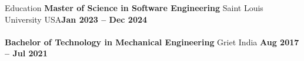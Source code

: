 \documentclass{resume}
\begin{document}
\vspace{-0.8em}
\begin{rSection}{Education}
\textbf{Master of Science in Software Engineering} \textbar{} Saint Louis University  \textbar{} USA\hfill \textbf{Jan 2023 -- Dec 2024}\\
\vspace{-1em}\\
\textbf{Bachelor of Technology in Mechanical Engineering}\textbar{} Griet  \textbar{} India  \hfill \textbf{Aug 2017 -- Jul 2021}
\end{rSection}
\end{document}
